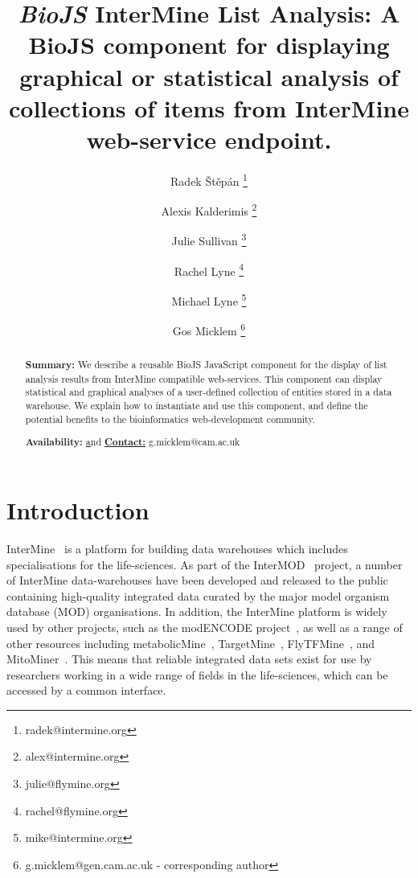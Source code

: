 \documentclass[10pt,a4paper,twocolumn]{article}
\begin{document}
\title{\textit{BioJS} InterMine List Analysis:
A BioJS component for displaying graphical or statistical analysis of
collections of items from InterMine web-service endpoint.
}

\author[1]{Radek Štěpán \thanks{radek@intermine.org}}
\author[1]{Alexis Kalderimis \thanks{alex@intermine.org}}
\author[1]{Julie Sullivan \thanks{julie@flymine.org}}
\author[1]{Rachel Lyne \thanks{rachel@flymine.org}}
\author[1]{Michael Lyne \thanks{mike@intermine.org}}
\author[1]{Gos Micklem \thanks{g.micklem@gen.cam.ac.uk - corresponding author}}

\maketitle
\thispagestyle{fancy}

\begin{abstract}

\textbf{Summary:}
We describe a reusable BioJS JavaScript component for the display of list
analysis results from InterMine compatible web-services. This component can display
statistical and graphical analyses of a user-defined collection of entities stored
in a data warehouse. We explain how to instantiate and use this component, and
define the potential benefits to the bioinformatics web-development community.

\textbf{Availability:}
\href{https://github.com/alexkalderimis/im-widgets-biojs} and
\href{http://github.com/biojs/biojs}

\textbf{Contact:} g.micklem@cam.ac.uk

\end{abstract}
\clearpage

\section*{Introduction}

InterMine~\cite{intermine} is a platform for building data warehouses which
includes specialisations for the life-sciences. As part of the
InterMOD~\cite{intermod} project, a number of InterMine data-warehouses have
been developed and released to the public containing high-quality integrated
data curated by the major model organism database (MOD) organisations. In
addition, the InterMine platform is widely used by other projects, such as the
modENCODE project~\cite{contrino2012}, as well as a range of other resources
including metabolicMine~\cite{metabolicmine}, TargetMine~\cite{targetmine},
FlyTFMine~\cite{flytfmine}, and MitoMiner~\cite{mitominer}. This means that
reliable integrated data sets exist for use by researchers working in a wide
range of fields in the life-sciences, which can be accessed by a common
interface.
\end{document}
